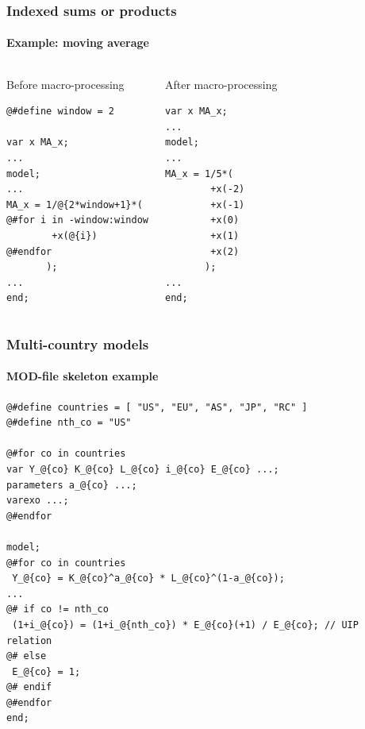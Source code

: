 \documentclass{beamer}
\begin{document}
\begin{frame}[fragile=singleslide]
  \frametitle{Indexed sums or products}
  \framesubtitle{Example: moving average}
  \begin{columns}[T]
    \begin{block}{Before macro-processing}
\begin{verbatim}
@#define window = 2

var x MA_x;
...
model;
...
MA_x = 1/@{2*window+1}*(
@#for i in -window:window
        +x(@{i})
@#endfor
       );
...
end;
\end{verbatim}
    \end{block}
    \begin{block}{After macro-processing}
\begin{verbatim}
var x MA_x;
...
model;
...
MA_x = 1/5*(
        +x(-2)
        +x(-1)
        +x(0)
        +x(1)
        +x(2)
       );
...
end;
\end{verbatim}
    \end{block}
  \end{columns}
\end{frame}

\begin{frame}[fragile=singleslide]
  \frametitle{Multi-country models}
  \framesubtitle{MOD-file skeleton example}
  \scriptsize
\begin{verbatim}
@#define countries = [ "US", "EU", "AS", "JP", "RC" ]
@#define nth_co = "US"

@#for co in countries
var Y_@{co} K_@{co} L_@{co} i_@{co} E_@{co} ...;
parameters a_@{co} ...;
varexo ...;
@#endfor

model;
@#for co in countries
 Y_@{co} = K_@{co}^a_@{co} * L_@{co}^(1-a_@{co});
...
@# if co != nth_co
 (1+i_@{co}) = (1+i_@{nth_co}) * E_@{co}(+1) / E_@{co}; // UIP relation
@# else
 E_@{co} = 1;
@# endif
@#endfor
end;
\end{verbatim}
  \normalsize
\end{frame}
\end{document}
